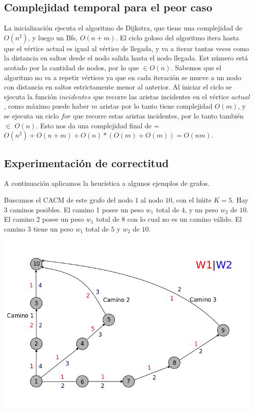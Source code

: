 \subsection{Complejidad temporal para el peor caso}

La inicializaci\'on ejecuta el algoritmo de Dijkstra, que tiene una complejidad de $O(n^2)$, y luego un Bfs, $O(n+m)$. El ciclo goloso del algoritmo itera hasta que el v\'ertice actual es igual al v\'ertice de llegada, y va a iterar tantas veces como la distancia en saltos desde el nodo salida hasta el nodo llegada. Est n\'umero est\'a acotado por la cantidad de nodos, por lo que $\in O(n)$. Sabemos que el algoritmo no va a repetir v\'ertices ya que  en cada iteraci\'on se mueve a un nodo con distancia en saltos estrictamente menor al anterior. Al iniciar el ciclo se ejecuta la funci\'on $incidentes$ que recorre las aristas incidentes en el v\'ertice $actual$, como m\'aximo puede haber $m$ aristas por lo tanto tiene complejidad $O(m)$, y se ejecuta un ciclo $for$ que recorre estas aristas incidentes, por lo tanto tambi\'en $\in$ $O(n)$. Esto nos da una complejidad final de = $ O(n^2)+ O(n+m)+ O(n)*(O(m)+O(m)) = O(nm)$. 

\subsection{Experimentaci\'on de correctitud}

A continuaci\'on aplicamos la heur\'istica a algunos ejemplos de grafos.

\vspace{10mm}

Buscamos el CACM de este grafo del nodo $1$ al nodo $10$, con el l\'mite $K = 5$. Hay 3 caminos posibles. El camino 1 posee un peso $w_1$ total de $4$, y un peso $w_2$ de $10$. El camino 2 posee un peso $w_1$ total de $8$ con lo cual no es un camino v\'alido. El camino 3 tiene un peso $w_1$ total de $5$ y $w_2$ de $10$.


\begin{center}
\includegraphics[scale=0.5]{img/grafoGoloso1.png}
\end{center}


